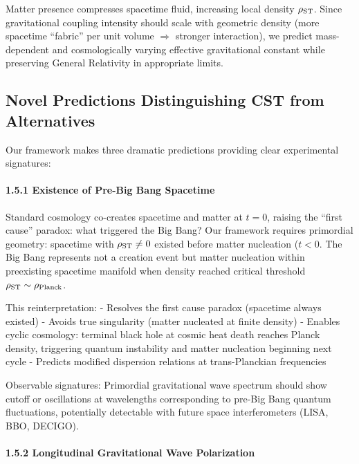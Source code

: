 \documentclass[11pt,a4paper]{article}
\begin{document}
Matter presence compresses spacetime fluid, increasing local density
\(\rho_{\rm ST}\). Since gravitational coupling intensity should scale
with geometric density (more spacetime ``fabric'' per unit volume
\(\Rightarrow\) stronger interaction), we predict mass-dependent and
cosmologically varying effective gravitational constant while preserving
General Relativity in appropriate limits.

\hypertarget{novel-predictions-distinguishing-cst-from-alternatives}{%
\subsection{Novel Predictions Distinguishing CST from
Alternatives}\label{novel-predictions-distinguishing-cst-from-alternatives}}

Our framework makes three dramatic predictions providing clear
experimental signatures:

\hypertarget{existence-of-pre-big-bang-spacetime}{%
\paragraph{1.5.1 Existence of Pre-Big Bang
Spacetime}\label{existence-of-pre-big-bang-spacetime}}

Standard cosmology co-creates spacetime and matter at \(t=0\), raising
the ``first cause'' paradox: what triggered the Big Bang? Our framework
requires primordial geometry: spacetime with \(\rho_{\rm ST} \neq 0\)
existed before matter nucleation (\(t<0\). The Big Bang represents not
a creation event but matter nucleation within preexisting spacetime
manifold when density reached critical threshold
\(\rho_{\rm ST} \sim \rho_{\rm Planck}\).

This reinterpretation: - Resolves the first cause paradox (spacetime
always existed) - Avoids true singularity (matter nucleated at finite
density) - Enables cyclic cosmology: terminal black hole at cosmic heat
death reaches Planck density, triggering quantum instability and matter
nucleation beginning next cycle - Predicts modified dispersion relations
at trans-Planckian frequencies

Observable signatures: Primordial gravitational wave spectrum should
show cutoff or oscillations at wavelengths corresponding to pre-Big Bang
quantum fluctuations, potentially detectable with future space
interferometers (LISA, BBO, DECIGO).

\hypertarget{longitudinal-gravitational-wave-polarization}{%
\paragraph{1.5.2 Longitudinal Gravitational Wave
Polarization}\label{longitudinal-gravitational-wave-polarization}}
\end{document}
